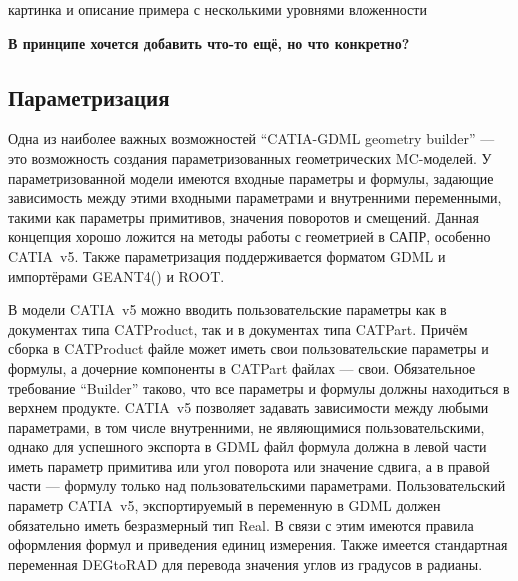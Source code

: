 \todo картинка и описание примера с несколькими уровнями вложенности

\todo \textbf{В принципе хочется добавить что-то ещё, но что конкретно?}

%                                                                                

\subsection{Параметризация}\label{sec:Parameterization}

Одна из наиболее важных возможностей ``CATIA-GDML geometry builder'' --- это возможность создания параметризованных геометрических MC-моделей. У параметризованной модели имеются входные параметры и формулы, задающие зависимость между этими входными параметрами и внутренними переменными, такими как параметры примитивов, значения поворотов и смещений. Данная концепция хорошо ложится на методы работы с геометрией в САПР, особенно CATIA~v5. Также параметризация поддерживается форматом GDML и импортёрами GEANT4(\todo) и ROOT.

В модели CATIA~v5 можно вводить пользовательские параметры как в документах типа CATProduct, так и в документах типа CATPart. Причём сборка в CATProduct файле может иметь свои пользовательские параметры и формулы, а дочерние компоненты в CATPart файлах --- свои. Обязательное требование ``Builder'' таково, что все параметры и формулы должны находиться в верхнем продукте. CATIA~v5 позволяет задавать зависимости между любыми параметрами, в том числе внутренними, не являющимися пользовательскими, однако для успешного экспорта в GDML файл формула должна в левой части иметь параметр примитива или угол поворота или значение сдвига, а в правой части --- формулу только над пользовательскими параметрами. Пользовательский параметр CATIA~v5, экспортируемый в переменную в GDML должен обязательно иметь безразмерный тип Real. В связи с этим имеются правила оформления формул и приведения единиц измерения. Также имеется стандартная переменная DEGtoRAD для перевода значения углов из градусов в радианы.

